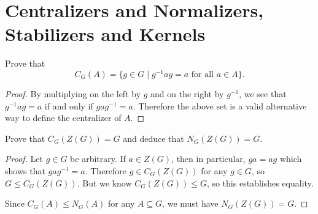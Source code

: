 \section{Centralizers and Normalizers, Stabilizers and Kernels}

 Prove that
\begin{equation*}
  C_G(A) = \{g\in G \mid \text{$g^{-1}ag = a$ for all $a\in A$}\}.
\end{equation*}
\begin{proof}
  By multiplying on the left by $g$ and on the right by $g^{-1}$, we
  see that $g^{-1}ag = a$ if and only if $gag^{-1} = a$. Therefore the
  above set is a valid alternative way to define the centralizer of
  $A$.
\end{proof}

 Prove that $C_G(Z(G)) = G$ and deduce that $N_G(Z(G)) = G$.
\begin{proof}
  Let $g\in G$ be arbitrary. If $a\in Z(G)$, then in particular,
  $ga = ag$ which shows that $gag^{-1} = a$. Therefore
  $g\in C_G(Z(G))$ for any $g\in G$, so $G\leq C_G(Z(G))$. But we know
  $C_G(Z(G))\leq G$, so this establishes equality.

  Since $C_G(A)\leq N_G(A)$ for any $A\subseteq G$, we must have
  $N_G(Z(G)) = G$.
\end{proof}
